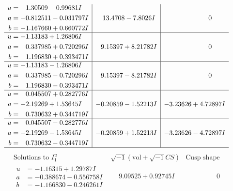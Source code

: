 \documentclass[1p]{elsarticle_modified}
\theoremstyle{definition}
\newcommand{\I}{\sqrt{-1}}
\begin{document}
$$\begin{array}{c|c|c}
\begin{aligned}
u &= \phantom{-}1.30509 - 0.99681 I \\
a &= -0.812511 - 0.031797 I \\
b &= -1.167660 + 0.660772 I\end{aligned}
 & \phantom{-}13.4708 - 7.8026 I & \phantom{-0.000000 } 0 \\ \hline\begin{aligned}
u &= -1.13183 + 1.26806 I \\
a &= \phantom{-}0.337985 + 0.720296 I \\
b &= \phantom{-}1.196830 + 0.393471 I\end{aligned}
 & \phantom{-}9.15397 + 8.21782 I & \phantom{-0.000000 } 0 \\ \hline\begin{aligned}
u &= -1.13183 - 1.26806 I \\
a &= \phantom{-}0.337985 - 0.720296 I \\
b &= \phantom{-}1.196830 - 0.393471 I\end{aligned}
 & \phantom{-}9.15397 - 8.21782 I & \phantom{-0.000000 } 0 \\ \hline\begin{aligned}
u &= \phantom{-}0.045507 + 0.282776 I \\
a &= -2.19269 + 1.53645 I \\
b &= \phantom{-}0.730632 + 0.344719 I\end{aligned}
 & -0.20859 - 1.52213 I & -3.23626 + 4.72897 I \\ \hline\begin{aligned}
u &= \phantom{-}0.045507 - 0.282776 I \\
a &= -2.19269 - 1.53645 I \\
b &= \phantom{-}0.730632 - 0.344719 I\end{aligned}
 & -0.20859 + 1.52213 I & -3.23626 - 4.72897 I\\
 \hline 
 \end{array}$$\newpage$$\begin{array}{c|c|c}  
\text{Solutions to }I^u_{1}& \I (\text{vol} + \sqrt{-1}CS) & \text{Cusp shape}\\
 \hline 
\begin{aligned}
u &= -1.16315 + 1.29787 I \\
a &= -0.388674 - 0.556758 I \\
b &= -1.166830 - 0.246261 I\end{aligned}
 & \phantom{-}9.09525 + 0.92745 I & \phantom{-0.000000 } 0 \\ \hline\begin{aligned}

\end{aligned}
\end{array}$$
\end{document}
